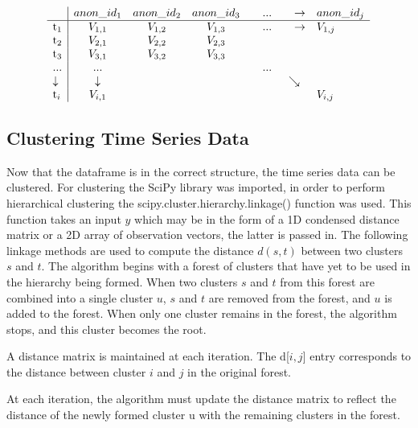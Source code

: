 \[ \begin{array}{l | cccccl}
\mbox{}         & anon\_id_1    & anon\_id_2    & anon\_id_3    & \quad ...     & \quad \rightarrow   & anon\_id_j \\
\hline
\mbox{t$_1$}    & V_{1,1}       &  V_{1,2}      &  V_{1,3}      & \quad ...     & \quad\rightarrow    &  V_{1,j}   \\
\mbox{t$_2$}    & V_{2,1}       &  V_{2,2}      &  V_{2,3}      &               &           & \\
\mbox{t$_3$}    & V_{3,1}       &  V_{3,2}      &  V_{3,3}      &               &           & \\
\mbox{...}      & ...           &               &               &\quad ...      &           & \\
\downarrow      & \downarrow    &               &               &               & \searrow  & \\
\mbox{t$_i$}    & V_{i,1}       &               &               &               &           & V_{i,j} \end{array}\]
    
    \subsection{Clustering Time Series Data}
    Now that the dataframe is in the correct structure, the time series data can be clustered. For clustering the SciPy library was imported, in order to perform hierarchical clustering the scipy.cluster.hierarchy.linkage() function was used. This function takes an input $y$ which may be in the form of a 1D condensed distance matrix or a 2D array of observation vectors, the latter is passed in. The following linkage methods are used to compute the distance $d(s,t)$ between two clusters $s$ and $t$. The algorithm begins with a forest of clusters that have yet to be used in the hierarchy being formed. When two clusters $s$ and $t$ from this forest are combined into a single cluster $u$, $s$ and $t$ are removed from the forest, and $u$ is added to the forest. When only one cluster remains in the forest, the algorithm stops, and this cluster becomes the root.
    
    A distance matrix is maintained at each iteration. The d[$i,j$] entry corresponds to the distance between cluster $i$ and $j$ in the original forest.

    At each iteration, the algorithm must update the distance matrix to reflect the distance of the newly formed cluster u with the remaining clusters in the forest.
    
